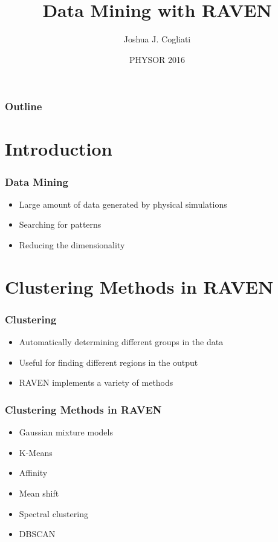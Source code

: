 \documentclass{beamer}
\title{Data Mining with RAVEN}
\author{Joshua J. Cogliati}
\date{PHYSOR 2016}
\begin{document}
\lstset{language=XML}

\begin{frame}
  \titlepage
\end{frame}

\begin{frame}
\frametitle{Outline}
\tableofcontents
\end{frame}

\section{Introduction}

\begin{frame}
  \frametitle{Data Mining}
  \begin{itemize}
  \item Large amount of data generated by physical simulations
  \item Searching for patterns
  \item Reducing the dimensionality
  \end{itemize}
\end{frame}

\section{Clustering Methods in RAVEN}

\begin{frame}
  \frametitle{Clustering}
  \begin{itemize}
  \item Automatically determining different groups in the data
  \item Useful for finding different regions in the output
  \item RAVEN implements a variety of methods
  \end{itemize}
\end{frame}

\begin{frame}
  \frametitle{Clustering Methods in RAVEN}
  \begin{itemize}
  \item Gaussian mixture models
  \item K-Means
  \item Affinity
  \item Mean shift
  \item Spectral clustering
  \item DBSCAN
  \end{itemize}
\end{frame}
\end{document}
